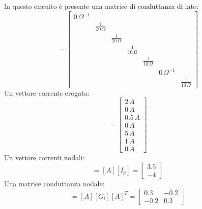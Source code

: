 \documentclass{article}
\numberwithin{equation}{subsection}
\begin{document}
In questo circuito è presente una matrice di conduttanza di lato:
\begin{equation*}
    [G_l]=\begin{bmatrix}
        0\,\Omega^{-1}&&&&&&\\
        &\displaystyle\frac{1}{20\,\Omega}&&&&&\\
        &&\displaystyle\frac{1}{20\,\Omega}&&&&\\
        &&&\displaystyle\frac{1}{10\,\Omega}&&&\\
        &&&&\displaystyle\frac{1}{10\,\Omega}&&\\
        &&&&&0\,\Omega^{-1}&\\
        &&&&&&\displaystyle\frac{1}{10\,\Omega}
    \end{bmatrix}
\end{equation*}
Un vettore corrente erogata:
\begin{equation*}
    [I_g]=\begin{bmatrix}
        2\,A\\
        0\,A\\
        0.5\,A\\
        0\,A\\
        5\,A\\
        1\,A\\
        0\,A
    \end{bmatrix}
\end{equation*}
Un vettore correnti nodali:
\begin{equation*}
    [I_{no}]=[A][I_g]=\begin{bmatrix}
        3.5\\
        -4
    \end{bmatrix}
\end{equation*}
Una matrice conduttanza nodale:
\begin{equation*}
    [G_{no}]=[A][G_l][A]^T=\begin{bmatrix}
        0.3&-0.2\\
        -0.2&0.3
    \end{bmatrix}
\end{equation*}
\end{document}
